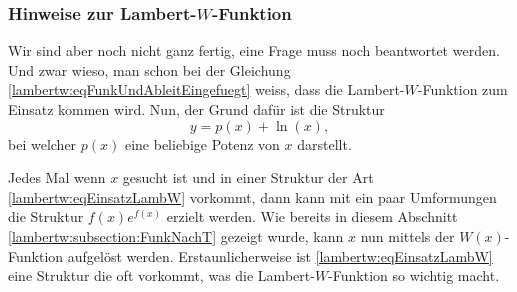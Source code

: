 \subsubsection{Hinweise zur Lambert-\(W\)-Funktion
	\label{lambertw:subsubsection:HinwLambertW}}
Wir sind aber noch nicht ganz fertig, eine Frage muss noch beantwortet werden. Und zwar wieso, man schon bei der Gleichung \eqref{lambertw:eqFunkUndAbleitEingefuegt} weiss, dass die Lambert-\(W\)-Funktion zum Einsatz kommen wird.
Nun, der Grund dafür ist die Struktur
\begin{equation}
	y
	=
	p(x) +\operatorname{ln}(x),
	\label{lambertw:eqEinsatzLambW}
\end{equation}
bei welcher \(p(x)\) eine beliebige Potenz von \(x\) darstellt. 

Jedes Mal wenn \(x\) gesucht ist und in einer Struktur der Art \eqref{lambertw:eqEinsatzLambW} vorkommt, dann kann mit ein paar Umformungen die Struktur \(f(x)e^{f(x)}\) erzielt werden. Wie bereits in diesem Abschnitt \ref{lambertw:subsection:FunkNachT} gezeigt wurde, kann \(x\) nun mittels der \(W(x)\)-Funktion aufgelöst werden. Erstaunlicherweise ist \eqref{lambertw:eqEinsatzLambW} eine Struktur die oft vorkommt, was die Lambert-\(W\)-Funktion so wichtig macht.   
